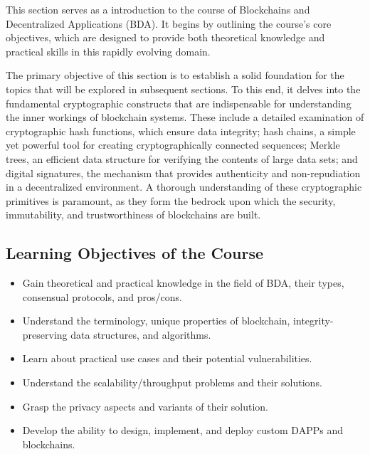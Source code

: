 
This section serves as a  introduction to the course of
Blockchains and Decentralized Applications (BDA). It begins by outlining
the course's core objectives, which are designed to provide both
theoretical knowledge and practical skills in this rapidly evolving
domain. 

The primary objective of this section is to establish a solid foundation
for the topics that will be explored in subsequent sections. To this
end, it delves into the fundamental cryptographic constructs that are
indispensable for understanding the inner workings of blockchain
systems. These include a detailed examination of cryptographic hash
functions, which ensure data integrity; hash chains, a simple yet
powerful tool for creating cryptographically connected sequences; Merkle trees, an
efficient data structure for verifying the contents of large data sets;
and digital signatures, the mechanism that provides authenticity and
non-repudiation in a decentralized environment. A thorough understanding
of these cryptographic primitives is paramount, as they form the bedrock
upon which the security, immutability, and trustworthiness of
blockchains are built.

\subsection{Learning Objectives of the Course}\label{learning-objectives}

\begin{itemize}
	\tightlist
	\item
	Gain theoretical and practical knowledge in the field of BDA, their
	types, consensual protocols, and pros/cons.
	\item
	Understand the terminology, unique properties of blockchain,
	integrity-preserving data structures, and algorithms.
	\item
	Learn about practical use cases and their potential vulnerabilities.
	\item
	Understand the scalability/throughput problems and their solutions.
	\item
	Grasp the privacy aspects and variants of their solution.
	\item
	Develop the ability to design, implement, and deploy custom DAPPs and
	blockchains.
\end{itemize}

